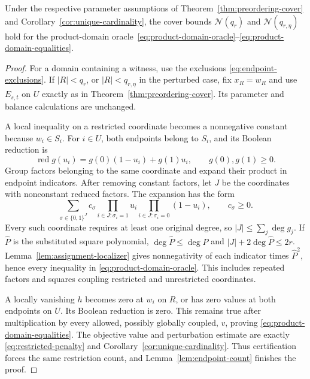 \begin{theorem}\label{thm:product-domain-cover}
Under the respective parameter assumptions of
Theorem~\ref{thm:preordering-cover} and
Corollary~\ref{cor:unique-cardinality}, the cover bounds
$\mathcal N(q_r)$ and $\mathcal N(q_{r,\eta})$ hold for the
product-domain oracle~\eqref{eq:product-domain-oracle}--\eqref{eq:product-domain-equalities}.
\end{theorem}
\begin{proof}
For a domain containing a witness, use the exclusions
\eqref{eq:endpoint-exclusions}. If $|R|<q_r$, or $|R|<q_{r,\eta}$ in
the perturbed case, fix $x_R=w_R$ and use $E_{s,t}$ on $U$ exactly as
in Theorem~\ref{thm:preordering-cover}. Its parameter and balance
calculations are unchanged.

A local inequality on a restricted coordinate becomes a nonnegative
constant because $w_i\in S_i$. For $i\in U$, both endpoints belong to
$S_i$, and its Boolean reduction is
\begin{equation}\label{eq:local-endpoint-interpolation}
 \operatorname{red}g(u_i)=g(0)(1-u_i)+g(1)u_i,
 \qquad g(0),g(1)\ge0.
\end{equation}
Group factors belonging to the same coordinate and expand their product
in endpoint indicators. After removing constant factors, let $J$ be the
coordinates with nonconstant reduced factors. The expansion has the form
\[
 \sum_{\sigma\in\{0,1\}^J} c_\sigma
       \prod_{i\in J:\sigma_i=1}u_i
       \prod_{i\in J:\sigma_i=0}(1-u_i),\qquad c_\sigma\ge0.
\]
Every such coordinate requires at least one original degree, so
$|J|\le\sum_j\deg g_j$. If $\widehat P$ is the substituted square
polynomial, $\deg\widehat P\le\deg P$ and
$|J|+2\deg\widehat P\le2r$.
Lemma~\ref{lem:assignment-localizer} gives nonnegativity of each
indicator times $\widehat P^2$, hence every inequality in
\eqref{eq:product-domain-oracle}. This includes repeated factors and
squares coupling restricted and unrestricted coordinates.

A locally vanishing $h$ becomes zero at $w_i$ on $R$, or has zero
values at both endpoints on $U$. Its Boolean reduction is zero. This
remains true after multiplication by every allowed, possibly globally
coupled, $v$, proving \eqref{eq:product-domain-equalities}.
The objective value and perturbation estimate are exactly
\eqref{eq:restricted-penalty} and Corollary~\ref{cor:unique-cardinality}.
Thus certification forces the same restriction count, and
Lemma~\ref{lem:endpoint-count} finishes the proof.
\end{proof}
